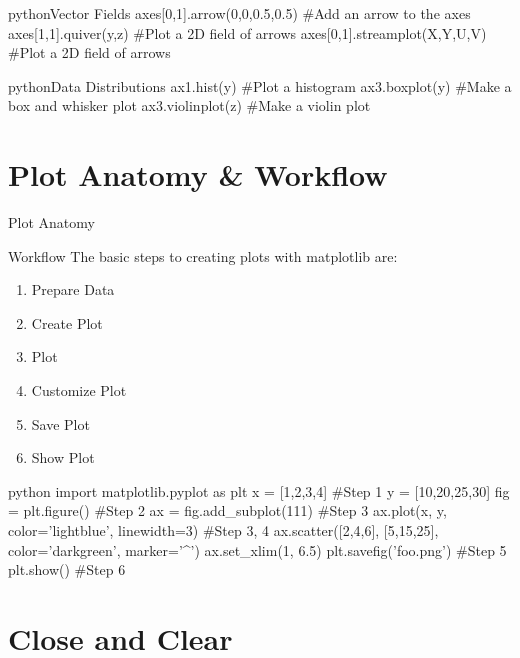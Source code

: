 \begin{codebox}{python}{Vector Fields}
axes[0,1].arrow(0,0,0.5,0.5)  #Add an arrow to the axes
axes[1,1].quiver(y,z)  #Plot a 2D field of arrows
axes[0,1].streamplot(X,Y,U,V)  #Plot a 2D field of arrows
\end{codebox}

\begin{codebox}{python}{Data Distributions}
ax1.hist(y)  #Plot a histogram
ax3.boxplot(y)  #Make a box and whisker plot
ax3.violinplot(z)  #Make a violin plot
\end{codebox}


\section{Plot Anatomy \& Workflow}
\begin{textbox}{Plot Anatomy}
\end{textbox}

\begin{textbox}{Workflow}
The basic steps to creating plots with matplotlib are:\\
\begin{enumerate}
    \item Prepare Data
    \item Create Plot
    \item Plot
    \item Customize Plot
    \item Save Plot
    \item Show Plot
\end{enumerate}
\end{textbox}

\begin{codebox}{python}{}
import matplotlib.pyplot as plt
x = [1,2,3,4]  #Step 1
y = [10,20,25,30]
fig = plt.figure()  #Step 2
ax = fig.add_subplot(111)  #Step 3
ax.plot(x, y, color='lightblue', linewidth=3)  #Step 3, 4
ax.scatter([2,4,6], [5,15,25], color='darkgreen', marker='^')
ax.set_xlim(1, 6.5)
plt.savefig('foo.png')  #Step 5
plt.show()  #Step 6
\end{codebox}


\section{Close and Clear}

